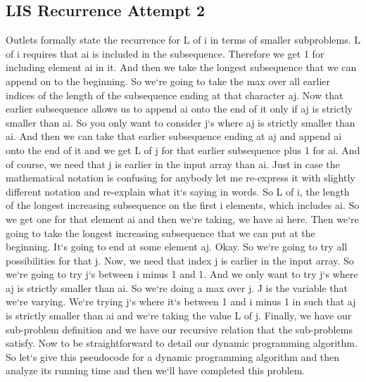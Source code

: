 \subsection{LIS  Recurrence Attempt 2}
Outlets formally state the recurrence for L of i in terms of smaller subproblems.
L of i requires that ai is included in the subsequence.
Therefore we get 1 for including element ai in it.
And then we take the longest subsequence that we can append on to the beginning.
So we`re going to take the max over all earlier indices of the length of the subsequence ending at that character aj.
Now that earlier subsequence allows us to append ai onto the end of it only if aj is strictly smaller than ai.
So you only want to consider j`s where aj is strictly smaller than ai.
And then we can take that earlier subsequence ending at aj and append ai onto the end of it and we get L of j for that earlier subsequence plus 1 for ai.
And of course, we need that j is earlier in the input array than ai.
Just in case the mathematical notation is confusing for anybody let me re-express it with slightly different notation and re-explain what it`s saying in words.
So L of i, the length of the longest increasing subsequence on the first i elements, which includes ai.
So we get one for that element ai and then we`re taking, we have ai here.
Then we`re going to take the longest increasing subsequence that we can put at the beginning.
It`s going to end at some element aj.
Okay.
So we`re going to try all possibilities for that j.
Now, we need that index j is earlier in the input array.
So we`re going to try j`s between i minus 1 and 1.
And we only want to try j`s where aj is strictly smaller than ai.
So we`re doing a max over j.
J is the variable that we`re varying.
We`re trying j`s where it`s between 1 and i minus 1 in such that aj is strictly smaller than ai and we`re taking the value L of j.
Finally, we have our sub-problem definition and we have our recursive relation that the sub-problems satisfy.
Now to be straightforward to detail our dynamic programming algorithm.
So let`s give this pseudocode for a dynamic programming algorithm and then analyze its running time and then we`ll have completed this problem.

